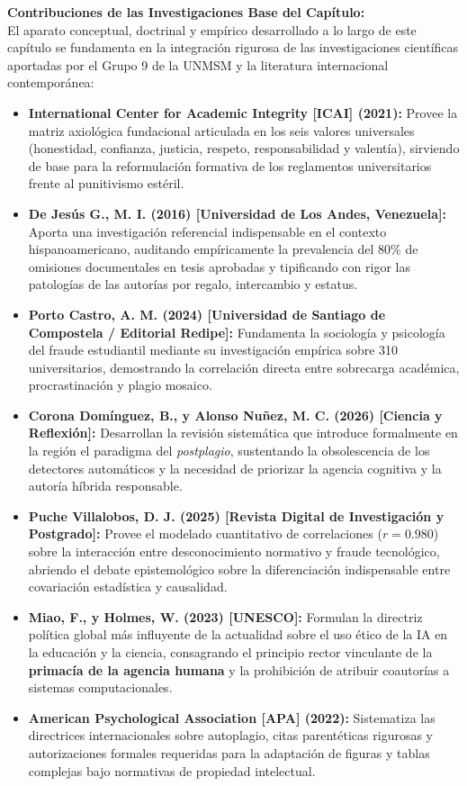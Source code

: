 \textbf{Contribuciones de las Investigaciones Base del Capítulo:}\\[0.2cm]
El aparato conceptual, doctrinal y empírico desarrollado a lo largo de este capítulo se fundamenta en la integración rigurosa de las investigaciones científicas aportadas por el Grupo 9 de la UNMSM y la literatura internacional contemporánea:
\begin{itemize}
    \item \textbf{International Center for Academic Integrity [ICAI] (2021):} Provee la matriz axiológica fundacional articulada en los seis valores universales (honestidad, confianza, justicia, respeto, responsabilidad y valentía), sirviendo de base para la reformulación formativa de los reglamentos universitarios frente al punitivismo estéril.
    \item \textbf{De Jesús G., M. I. (2016) [Universidad de Los Andes, Venezuela]:} Aporta una investigación referencial indispensable en el contexto hispanoamericano, auditando empíricamente la prevalencia del 80\% de omisiones documentales en tesis aprobadas y tipificando con rigor las patologías de las autorías por regalo, intercambio y estatus.
    \item \textbf{Porto Castro, A. M. (2024) [Universidad de Santiago de Compostela / Editorial Redipe]:} Fundamenta la sociología y psicología del fraude estudiantil mediante su investigación empírica sobre 310 universitarios, demostrando la correlación directa entre sobrecarga académica, procrastinación y plagio mosaico.
    \item \textbf{Corona Domínguez, B., y Alonso Nuñez, M. C. (2026) [Ciencia y Reflexión]:} Desarrollan la revisión sistemática que introduce formalmente en la región el paradigma del \textit{postplagio}, sustentando la obsolescencia de los detectores automáticos y la necesidad de priorizar la agencia cognitiva y la autoría híbrida responsable.
    \item \textbf{Puche Villalobos, D. J. (2025) [Revista Digital de Investigación y Postgrado]:} Provee el modelado cuantitativo de correlaciones ($r = 0.980$) sobre la interacción entre desconocimiento normativo y fraude tecnológico, abriendo el debate epistemológico sobre la diferenciación indispensable entre covariación estadística y causalidad.
    \item \textbf{Miao, F., y Holmes, W. (2023) [UNESCO]:} Formulan la directriz política global más influyente de la actualidad sobre el uso ético de la IA en la educación y la ciencia, consagrando el principio rector vinculante de la \textbf{primacía de la agencia humana} y la prohibición de atribuir coautorías a sistemas computacionales.
    \item \textbf{American Psychological Association [APA] (2022):} Sistematiza las directrices internacionales sobre autoplagio, citas parentéticas rigurosas y autorizaciones formales requeridas para la adaptación de figuras y tablas complejas bajo normativas de propiedad intelectual.
\end{itemize}
\vspace{0.4cm}


